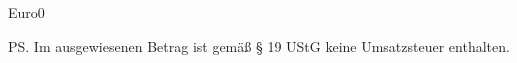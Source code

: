 \documentclass[a4paper]{scrlttr2}
\begin{document}
	\begin{letter}{\customerCompany \\ \customerName \\ 
	\customerStreet \\ \customerZIP \ \customerCity}
	
			\vspace{-1.6em}
			\opening{\invoiceSalutation}
			\invoiceText
		    \begin{invoice}{Euro}{0}
			    
		    \end{invoice}
		\ps Im ausgewiesenen Betrag ist gemäß § 19 UStG keine Umsatzsteuer 
		enthalten.

		\closing{\invoiceClosing}
		\invoiceEnclosures



	\end{letter}
\end{document}
